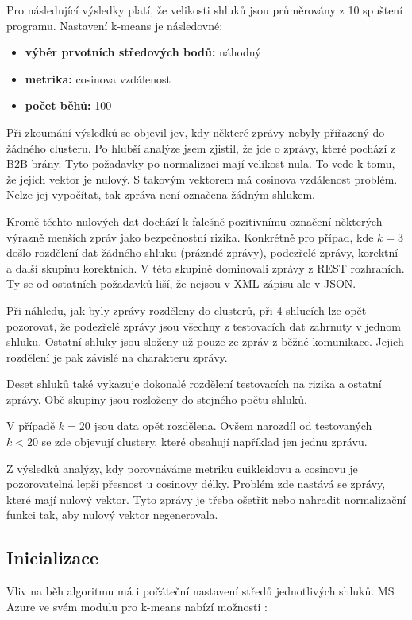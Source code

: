 \documentclass[thesis=M,czech]{FITthesis}[2012/10/20]
\begin{document}
			Pro následující výsledky platí, že velikosti shluků jsou průměrovány z 10 spuštení programu. Nastavení k-means je následovné:
			\begin{itemize} 
				\item \textbf{výběr prvotních středových bodů: } náhodný
				\item \textbf{metrika: } cosinova vzdálenost
				\item \textbf{počet běhů: } 100		
			\end{itemize}
		
			Při zkoumání výsledků se objevil jev, kdy některé zprávy nebyly přiřazený do žádného clusteru. Po hlubší analýze jsem zjistil, že jde o zprávy, které pochází z B2B brány. Tyto požadavky po normalizaci mají velikost nula. To vede k tomu, že jejich vektor je nulový. S takovým vektorem má cosinova vzdálenost problém. Nelze jej vypočítat, tak zpráva není označena žádným shlukem.
			
			Kromě těchto nulových dat dochází k falešně pozitivnímu označení některých výrazně menších zpráv jako bezpečnostní rizika. Konkrétně pro případ, kde $k = 3$ došlo rozdělení dat žádného shluku (prázndé zprávy), podezřelé zprávy, korektní a další skupinu korektních. V této skupině dominovali zprávy z REST rozhraních. Ty se od ostatních požadavků liší, že nejsou v XML zápisu ale v JSON.
			
			Při náhledu, jak byly zprávy rozděleny do clusterů, při 4 shlucích lze opět pozorovat, že podezřelé zprávy jsou všechny z testovacích dat zahrnuty v jednom shluku. Ostatní shluky jsou složeny už pouze ze zpráv z běžné komunikace. Jejich rozdělení je pak závislé na charakteru zprávy.
			
			Deset shluků také vykazuje dokonalé rozdělení testovacích na rizika a ostatní zprávy. Obě skupiny jsou rozloženy do stejného počtu shluků.
			
			V případě $ k = 20$ jsou data opět rozdělena. Ovšem narozdíl od testovaných $k < 20$ se zde objevují clustery, které obsahují například jen jednu zprávu. 
			
			Z výsledků analýzy, kdy porovnáváme metriku euikleidovu a cosinovu je pozorovatelná lepší přesnost u cosinovy délky. Problém zde nastává se zprávy, které mají nulový vektor. Tyto zprávy je třeba ošetřit nebo nahradit normalizační funkci tak, aby nulový vektor negenerovala. 			
			
		\subsection{Inicializace}
			Vliv na běh algoritmu má i počáteční nastavení středů jednotlivých shluků. MS Azure ve svém modulu pro k-means nabízí možnosti \cite{MSAzure-kmeans}:
			
\end{document}
